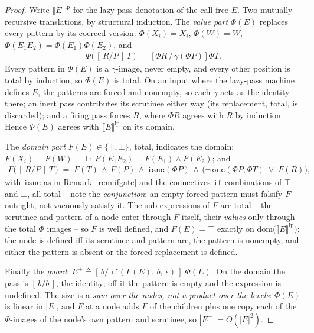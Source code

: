\documentclass[runningheads,envcountsect]{llncs}
\begin{document}
\begin{proof}
    Write $\llbracket E \rrbracket^{\mathrm{lp}}$ for the lazy-pass denotation of the call-free $E$. Two mutually recursive translations, by structural induction. The \emph{value part} $\Phi(E)$ replaces every pattern by its coerced version: $\Phi(X_i) = X_i$, $\Phi(W) = W$, $\Phi(E_1 E_2) = \Phi(E_1)\Phi(E_2)$, and
    \begin{align*}
        \Phi\big(\,[\,R/P\,]\,T\,\big) \;=\; \big[\,\Phi R\,/\,\gamma(\Phi P)\,\big]\,\Phi T .
    \end{align*}
    Every pattern in $\Phi(E)$ is a $\gamma$-image, never empty, and every other position is total by induction, so $\Phi(E)$ is total. On an input where the lazy-pass machine defines $E$, the patterns are forced and nonempty, so each $\gamma$ acts as the identity there; an inert pass contributes its scrutinee either way (its replacement, total, is discarded); and a firing pass forces $R$, where $\Phi R$ agrees with $R$ by induction. Hence $\Phi(E)$ agrees with $\llbracket E \rrbracket^{\mathrm{lp}}$ on its domain.

    The \emph{domain part} $F(E) \in \{\top, \bot\}$, total, indicates the domain: $F(X_i) = F(W) = \top$; $F(E_1 E_2) = F(E_1) \wedge F(E_2)$; and
    \begin{align*}
        F\big(\,[\,R/P\,]\,T\,\big) \;=\;
        F(T) \,\wedge\, F(P) \,\wedge\, \mathtt{isne}(\Phi P)
        \,\wedge\, \big(\neg\,\mathtt{occ}(\Phi P, \Phi T) \;\vee\; F(R)\big),
    \end{align*}
    with $\mathtt{isne}$ as in Remark~\ref{rem:ifgate} and the connectives $\mathtt{if}$-combinations of $\top$ and $\bot$, all total -- note the \emph{conjunction}: an empty forced pattern must falsify $F$ outright, not vacuously satisfy it. The sub-expressions of $F$ are total -- the scrutinee and pattern of a node enter through $F$ itself, their \emph{values} only through the total $\Phi$ images -- so $F$ is well defined, and $F(E) = \top$ exactly on $\mathrm{dom}\big(\llbracket E \rrbracket^{\mathrm{lp}}\big)$: the node is defined iff its scrutinee and pattern are, the pattern is nonempty, and either the pattern is absent or the forced replacement is defined.

    Finally the \emph{guard}: $E^{+} \triangleq [\,b/\,\mathtt{if}(F(E),\, b,\, \epsilon)\,]\;\Phi(E)$. On the domain the pass is $[\,b/b\,]$, the identity; off it the pattern is empty and the expression is undefined. The size is a \emph{sum over the nodes, not a product over the levels}: $\Phi(E)$ is linear in $|E|$, and $F$ at a node adds $F$ of the children plus one copy each of the $\Phi$-images of the node's own pattern and scrutinee, so $|E^{+}| = O(|E|^2)$.

\end{proof}
\end{document}
